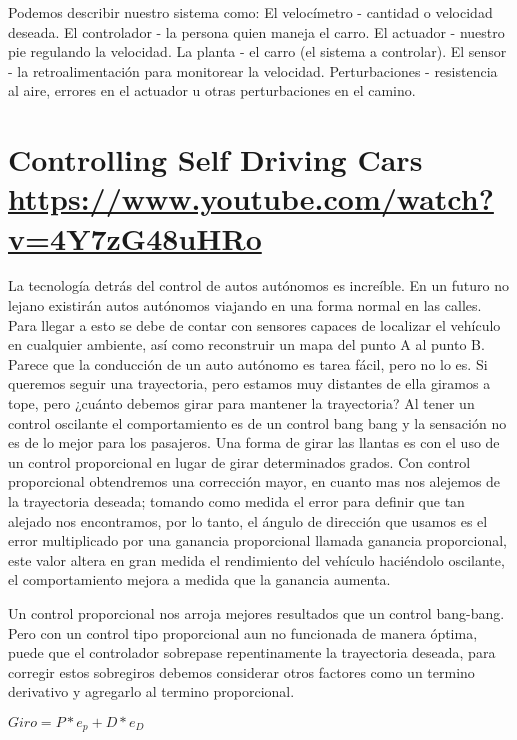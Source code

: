 \documentclass[
	12pt, %
]{fphw}
\begin{document}
Podemos describir nuestro sistema como:
El velocímetro - cantidad o velocidad deseada.
El controlador - la persona quien maneja el carro.
El actuador - nuestro pie regulando la velocidad.
La planta - el carro (el sistema a controlar).
El sensor - la retroalimentación para monitorear la velocidad.
Perturbaciones - resistencia al aire, errores en el actuador u otras perturbaciones en el camino.

\newpage
\section*{{\color{RoyalPurple}Controlling Self Driving Cars} \url{https://www.youtube.com/watch?v=4Y7zG48uHRo}}

La tecnología detrás del control de autos autónomos es increíble. En un futuro no lejano existirán autos autónomos viajando en una forma normal en las calles. Para llegar a esto se debe de contar con sensores capaces de localizar el vehículo en cualquier ambiente, así como reconstruir un mapa del punto A al punto B.
Parece que la conducción de un auto autónomo es tarea fácil, pero no lo es.
Si queremos seguir una trayectoria, pero estamos muy distantes de ella giramos a tope, pero ¿cuánto debemos girar para mantener la trayectoria?
Al tener un control oscilante el comportamiento es de un control bang bang y la sensación no es de lo mejor para los pasajeros. Una forma de girar las llantas es con el uso de un control proporcional en lugar de girar determinados grados.
Con control proporcional obtendremos una corrección mayor, en cuanto mas nos alejemos de la trayectoria deseada; tomando como medida el error para definir que tan alejado nos encontramos, por lo tanto, el ángulo de dirección que usamos es el error multiplicado por una ganancia proporcional llamada ganancia proporcional, este valor altera en gran medida el rendimiento del vehículo haciéndolo oscilante, el comportamiento mejora a medida que la ganancia aumenta.

Un control proporcional nos arroja mejores resultados que un control bang-bang. Pero con un control tipo proporcional aun no funcionada de manera óptima, puede que el controlador sobrepase repentinamente la trayectoria deseada, para corregir estos sobregiros debemos considerar otros factores como un termino derivativo y agregarlo al termino proporcional.

$Giro = P*e_{p}+D* e_{D}$
\end{document}
